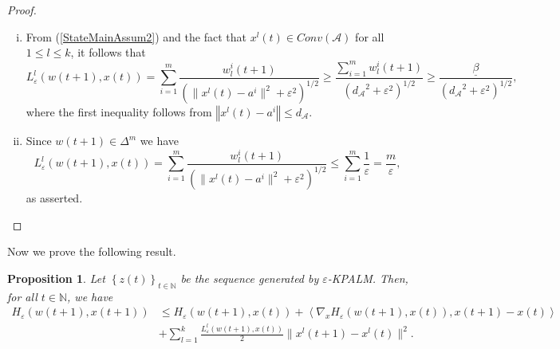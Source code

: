 \documentclass[11pt]{article}
\numberwithin{equation}{section}
\newtheorem{proposition}{Proposition}[section]
\newcommand{\norm}[1]{\left\Vert {#1} \right\Vert} %
\begin{document}
\begin{proof}
\begin{enumerate}[(i)]
	\item From (\ref{StateMainAssum2}) and the fact that $x^l(t) \in Conv(\mathcal{A})$ for all $1 \leq l \leq k$, it follows that
	\begin{equation*}
		L^l_{\varepsilon}(w(t+1),x(t)) = \sum\limits_{i=1}^{m} \frac{w^i_l(t+1)}{\left( \|x^l(t) - a^i\|^2 + {\varepsilon}^2 \right)^{1/2}} \geq \frac{\sum_{i=1}^{m}w^i_l(t+1)}{\left( {d_{\mathcal{A}}}^2 + {\varepsilon}^2 \right)^{1/2}} \geq \frac{\underline{\beta}}{\left( {d_{\mathcal{A}}}^2 + {\varepsilon}^2 \right)^{1/2}} ,
	\end{equation*}
	where the first inequality follows from $\norm{x^l(t) - a^i} \leq d_{\mathcal{A}}$. 
	\item Since $w(t+1) \in {\Delta}^m$ we have
	\begin{equation*}
		L^l_{\varepsilon}(w(t+1),x(t)) = \sum\limits_{i=1}^{m} \frac{w^i_l(t+1)}{\left( \|x^l(t) - a^i\|^2 + {\varepsilon}^2 \right)^{1/2}} \leq \sum\limits_{i=1}^{m} \frac{1}{\varepsilon} = \frac{m}{\varepsilon} ,
	\end{equation*}
	as asserted.
\end{enumerate}
\end{proof}

Now we prove the following result.

\begin{proposition} \label{State_H_eps_prop}
Let $\left\lbrace z(t) \right\rbrace_{t \in \mathbb{N}}$ be the sequence generated by $\varepsilon$-KPALM. Then, for all $t \in \mathbb{N}$, we have
\begin{align*}
	H_{\varepsilon}(w(t+1),x(t+1)) 
	&\leq H_{\varepsilon}(w(t+1),x(t)) + \left\langle \nabla_x H_{\varepsilon}(w(t+1),x(t)), x(t+1)-x(t) \right\rangle \\
	&+ \sum\limits_{l=1}^{k} \frac{L^l_{\varepsilon}(w(t+1),x(t))}{2} \|x^l(t+1)-x^l(t)\|^2 .
\end{align*}
\end{proposition}
\end{document}
